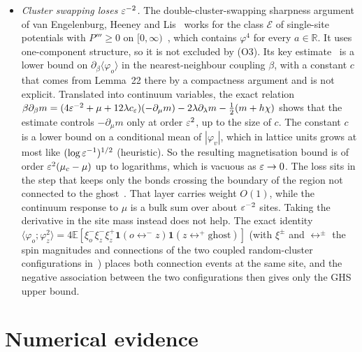 \begin{itemize}
\item[(O7)] \emph{Cluster swapping loses $\varepsilon^{-2}$.} The double-cluster-swapping sharpness argument of van Engelenburg, Heeney and Lis~\cite{vEHL26} works for the class $\mathcal E$ of single-site potentials with $P'''\ge0$ on $[0,\infty)$~\cite[Definition~3]{vEHL26}, which contains $\varphi^4$ for every $a\in\mathbb R$. It uses one-component structure, so it is not excluded by (O3). Its key estimate~\cite[Proposition~20]{vEHL26} is a lower bound on $\partial_\beta\langle\varphi_o\rangle$ in the nearest-neighbour coupling $\beta$, with a constant $c$ that comes from Lemma~22 there by a compactness argument and is not explicit. Translated into continuum variables, the exact relation $\beta\partial_\beta m=(4\varepsilon^{-2}+\mu+12\lambda c_\varepsilon)(-\partial_\mu m)-2\lambda\partial_\lambda m-\tfrac12(m+h\chi)$ shows that the estimate controls $-\partial_\mu m$ only at order $\varepsilon^2$, up to the size of $c$. The constant $c$ is a lower bound on a conditional mean of $|\varphi_v|$, which in lattice units grows at most like $(\log\varepsilon^{-1})^{1/2}$ (heuristic). So the resulting magnetisation bound is of order $\varepsilon^2(\mu_c-\mu)$ up to logarithms, which is vacuous as $\varepsilon\to0$. The loss sits in the step that keeps only the bonds crossing the boundary of the region not connected to the ghost~\cite[proof of Proposition~20, Step~3]{vEHL26}. That layer carries weight $O(1)$, while the continuum response to $\mu$ is a bulk sum over about $\varepsilon^{-2}$ sites. Taking the derivative in the site mass instead does not help. The exact identity $\langle\varphi_o;\varphi_z^2\rangle=4\mathbb E[\xi^-_o\xi^-_z\xi^+_z\mathbf 1(o\leftrightarrow^-z)\mathbf 1(z\leftrightarrow^+\mathrm{ghost})]$ (with $\xi^\pm$ and $\leftrightarrow^\pm$ the spin magnitudes and connections of the two coupled random-cluster configurations in~\cite{vEHL26}) places both connection events at the same site, and the negative association between the two configurations then gives only the GHS upper bound.
\end{itemize}

\section{Numerical evidence}\label{sec:numerics}

